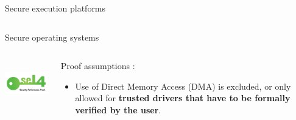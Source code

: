 \documentclass[xcolor={x11names}]{beamer}
\begin{document}
\begin{frame}{Secure execution platforms}
\begin{columns}
\begin{column}{0.6\textwidth}
{                \bigskip

            }
        \end{column}
    \end{columns}
\end{frame}

\begin{frame}{Secure operating systems}
    \begin{columns}
        \begin{column}{0.4\textwidth}
            \begin{center}
                \includegraphics[height=2cm]{logos/seL4-logo-text-white.png}
            \end{center}
        \end{column}
        \begin{column}{0.6\textwidth}
            Proof assumptions \cite{noauthor_is_nodate}:
            \pause
            \begin{itemize}
                \item Use of Direct Memory Access (DMA) is excluded, or only allowed for \textbf{trusted drivers that have to be formally verified by the user}.
            \end{itemize}

        \end{column}
    \end{columns}
\end{frame}
\end{document}

